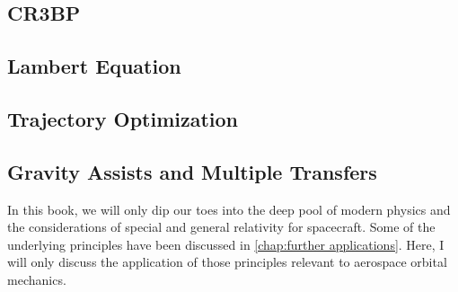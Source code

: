 \subsection{CR3BP}
\subsection{Lambert Equation}
\subsection{Trajectory Optimization}
\subsection{Gravity Assists and Multiple Transfers}


In this book, we will only dip our toes into the deep pool of modern physics and the considerations of special and general relativity for spacecraft. Some of the underlying principles have been discussed in \autoref{chap:further applications}. Here, I will only discuss the application of those principles relevant to aerospace orbital mechanics.
